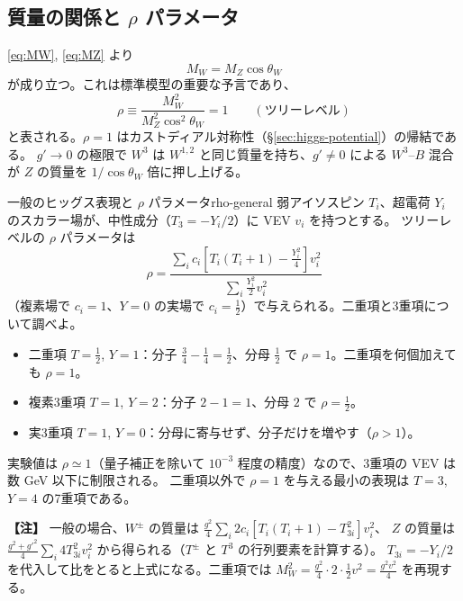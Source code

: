 \documentclass[uplatex,dvipdfmx,a4paper,11pt,openany]{jsbook}
\newenvironment{note}{\vspace{1ex}\par\footnotesize\noindent\textbf{【注】}}{\par\vspace{1ex}}
\numberwithin{equation}{chapter}
\theoremstyle{definition}
\theoremstyle{plain}
\theoremstyle{remark}
\begin{document}
\subsection{質量の関係と $\rho$ パラメータ}
\eqref{eq:MW}, \eqref{eq:MZ} より
\begin{equation}
\boxed{M_W=M_Z\cos\theta_W}
\label{eq:MW-MZ}
\end{equation}
が成り立つ。これは標準模型の重要な予言であり、
\begin{equation}
\rho\equiv\frac{M_W^2}{M_Z^2\cos^2\theta_W}=1\qquad(\text{ツリーレベル})
\label{eq:rho}
\end{equation}
と表される。$\rho=1$ はカストディアル対称性（\S\ref{sec:higgs-potential}）の帰結である。
$g'\to0$ の極限で $W^3$ は $W^{1,2}$ と同じ質量を持ち、$g'\ne0$ による $W^3$--$B$ 混合が
$Z$ の質量を $1/\cos\theta_W$ 倍に押し上げる。
\begin{myex}{一般のヒッグス表現と $\rho$ パラメータ}{rho-general}
弱アイソスピン $T_i$、超電荷 $Y_i$ のスカラー場が、中性成分（$T_{3}=-Y_i/2$）に VEV $v_i$ を持つとする。
ツリーレベルの $\rho$ パラメータは
\[
\rho=\frac{\sum_i c_i\left[T_i(T_i+1)-\frac{Y_i^2}{4}\right]v_i^2}{\sum_i\frac{Y_i^2}{2}v_i^2}
\]
（複素場で $c_i=1$、$Y=0$ の実場で $c_i=\frac12$）で与えられる。二重項と3重項について調べよ。
\tcblower
\begin{itemize}
    \item 二重項 $T=\frac12$, $Y=1$：分子 $\frac34-\frac14=\frac12$、分母 $\frac12$ で $\rho=1$。二重項を何個加えても $\rho=1$。
    \item 複素3重項 $T=1$, $Y=2$：分子 $2-1=1$、分母 $2$ で $\rho=\frac12$。
    \item 実3重項 $T=1$, $Y=0$：分母に寄与せず、分子だけを増やす（$\rho>1$）。
\end{itemize}
実験値は $\rho\simeq1$（量子補正を除いて $10^{-3}$ 程度の精度）なので、3重項の VEV は数 GeV 以下に制限される。
二重項以外で $\rho=1$ を与える最小の表現は $T=3$, $Y=4$ の7重項である。
\end{myex}
\begin{note}
一般の場合、$W^\pm$ の質量は $\frac{g^2}{4}\sum_i2c_i[T_i(T_i+1)-T_{3i}^2]v_i^2$、
$Z$ の質量は $\frac{g^2+g'^2}{4}\sum_i4T_{3i}^2v_i^2$ から得られる（$T^\pm$ と $T^3$ の行列要素を計算する）。
$T_{3i}=-Y_i/2$ を代入して比をとると上式になる。二重項では $M_W^2=\frac{g^2}{4}\cdot2\cdot\frac12v^2=\frac{g^2v^2}{4}$ を再現する。
\end{note}
\end{document}
